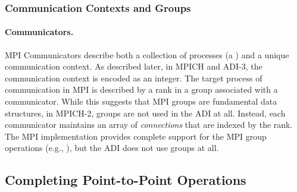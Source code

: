 \subsubsection{Communication Contexts and Groups}

\paragraph{Communicators.}

MPI Communicators describe both a collection of processes (a
) and a unique communication context.  As described
later, in MPICH and ADI-3, the communication context is encoded as an
integer.  The target process of communication in MPI is described by a
rank in a group associated with a communicator.  While this suggests
that MPI groups are fundamental data structures, in MPICH-2, groups
are not used in the ADI at all.  Instead, each communicator maintains
an array of \emph{connections} that are indexed by the rank.
The MPI implementation provides complete support for the MPI group
operations (e.g., ), but the ADI does not use
groups at all.  


\subsection{Completing Point-to-Point Operations}


